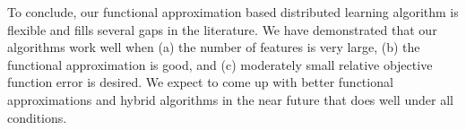 

To conclude, our functional approximation based distributed learning algorithm is flexible and fills several gaps in the literature. We have demonstrated that our algorithms work well when (a) the number of features is very large, (b) the functional approximation is good, and (c) moderately small relative objective function error is desired. We expect to come up with better functional approximations and hybrid algorithms in the near future that does well under all conditions.





